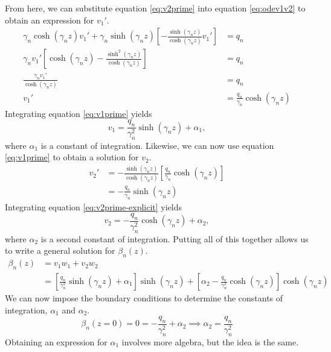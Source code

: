 From here, we can substitute equation \eqref{eq:v2prime} into equation \eqref{eq:odev1v2} to obtain an expression for $v_1'$.
\begin{align}
    \gamma_n \cosh(\gamma_n z) v_1' + \gamma_n \sinh(\gamma_n z) \left[-\frac{\sinh(\gamma_n z)}{\cosh(\gamma_n z)} v_1'\right] &= q_n\\
    \gamma_n v_1' \left[\cosh(\gamma_n z) - \frac{\sinh^2(\gamma_n z)}{\cosh(\gamma_n z)}\right] &= q_n\\
    \frac{\gamma_n v_1'}{\cosh(\gamma_n z)} &= q_n\\
    v_1' &= \frac{q_n}{\gamma_n}\cosh(\gamma_n z) \label{eq:v1prime}
\end{align}
Integrating equation \eqref{eq:v1prime} yields
\begin{equation}
    \boxed{v_1 = \frac{q_n}{\gamma_n^2} \sinh(\gamma_n z) + \alpha_1,}
\end{equation}
where $\alpha_1$ is a constant of integration. Likewise, we can now use equation \eqref{eq:v1prime} to obtain a solution for $v_2$.
\begin{align}
    v_2' &= -\frac{\sinh(\gamma_n z)}{\cosh(\gamma_n z)}\left[\frac{q_n}{\gamma_n}\cosh(\gamma_n z)\right]\nonumber\\
    &= -\frac{q_n}{\gamma_n} \sinh(\gamma_n z) \label{eq:v2prime-explicit}
\end{align}
Integrating equation \eqref{eq:v2prime-explicit} yields
\begin{equation}
    \boxed{v_2 = -\frac{q_n}{\gamma_n^2} \cosh(\gamma_n z) + \alpha_2,}
\end{equation}
where $\alpha_2$ is a second constant of integration. Putting all of this together allows us to write a general solution for $\beta_n(z)$.
\begin{align}
    \beta_n(z) &= v_1 w_1 + v_2 w_2\nonumber\\
    &= \left[\frac{q_n}{\gamma_n^2}\sinh(\gamma_n z) + \alpha_1\right]\sinh(\gamma_n z) + \left[\alpha_2 - \frac{q_n}{\gamma_n^2}\cosh(\gamma_n z)\right]\cosh(\gamma_n z) \label{eq:beta-gen-sol}
\end{align}
We can now impose the boundary conditions to determine the constants of integration, $\alpha_1$ and $\alpha_2$.
\begin{equation}
    \beta_n(z=0) = 0 = -\frac{q_n}{\gamma_n^2} + \alpha_2
    \implies 
    \alpha_2 = \frac{q_n}{\gamma_n^2}
\end{equation}
Obtaining an expression for $\alpha_1$ involves more algebra, but the idea is the same.
